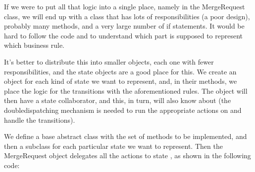 \documentclass[a4paper,10pt,english]{sphinxmanual}
\begin{document}
If we were to put all that logic into a single place, namely in the MergeRequest class, we
will end up with a class that has lots of responsibilities (a poor design), probably many
methods, and a very large number of if statements. It would be hard to follow the code
and to understand which part is supposed to represent which business rule.

It’s better to distribute this into smaller objects, each one with fewer responsibilities, and the
state objects are a good place for this. We create an object for each kind of state we want to
represent, and, in their methods, we place the logic for the transitions with the
aforementioned rules. The  object will then have a state collaborator, and
this, in turn, will also know about  (the double\sphinxhyphen{}dispatching mechanism is
needed to run the appropriate actions on  and handle the transitions).

We define a base abstract class with the set of methods to be implemented, and then a
subclass for each particular state we want to represent. Then the MergeRequest object
delegates all the actions to state , as shown in the following code:
\end{document}
